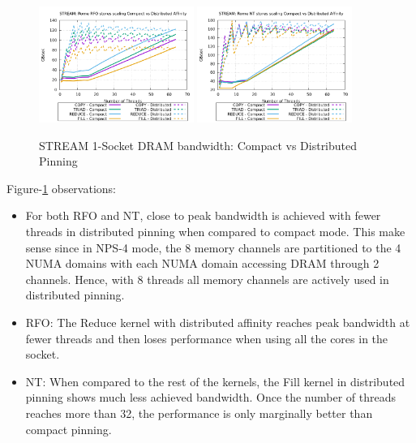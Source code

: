 \documentclass{article}
\begin{document}
\begin{figure}[!ht]
    \centering
    \includegraphics[width=0.45\textwidth]{../data/rome-clx-icx/mem_bw_scale/Rome_scale_affinity_rfo}
    \includegraphics[width=0.45\textwidth]{../data/rome-clx-icx/mem_bw_scale/Rome_scale_affinity_nt}
    \caption{STREAM 1-Socket DRAM bandwidth: Compact vs Distributed Pinning}
    \label{figure:mem_bw_scale_affinity_rfo_nt}
\end{figure}

Figure-\ref{figure:mem_bw_scale_affinity_rfo_nt} observations:
\begin{itemize}
\item For both RFO and NT, close to peak bandwidth is achieved with fewer threads in distributed pinning when compared to compact mode. This make sense since in NPS-4 mode, the 8 memory channels are partitioned to the 4 NUMA domains with each NUMA domain accessing DRAM through 2 channels. Hence, with 8 threads all memory channels are actively used in distributed pinning.
\item RFO: The Reduce kernel with distributed affinity reaches peak bandwidth at fewer threads and then loses performance when using all the cores in the socket.
\item NT: When compared to the rest of the kernels, the Fill kernel in distributed pinning shows much less achieved bandwidth. Once the number of threads reaches more than 32, the performance is only marginally better than compact pinning.
\end{itemize}
\end{document}
